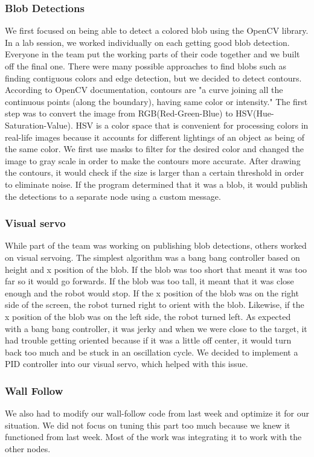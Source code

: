 \documentclass[journal, a4paper]{IEEEtran}
\begin{document}
\subsubsection{Blob Detections}We first focused on being able to detect a colored blob using the OpenCV library. In a lab session, we worked individually on each getting good blob detection. Everyone in the team put the working parts of their code together and we built off the final one. There were many possible approaches to find blobs such as finding contiguous colors and edge detection, but we decided to detect contours. According to OpenCV documentation, contours are "a curve joining all the continuous points (along the boundary), having same color or intensity." \cite{opencv-docs} The first step was to convert the image from RGB(Red-Green-Blue) to HSV(Hue-Saturation-Value). HSV is a color space that is convenient for processing colors in real-life images because it accounts for different lightings of an object as being of the same color. \cite{colorspace-handout} We first use masks to filter for the desired color and changed the image to gray scale in order to make the contours more accurate. After drawing the contours, it would check if the size is larger than a certain threshold in order to eliminate noise. If the program determined that it was a blob, it would publish the detections to a separate node using a custom message. 
\subsubsection{Visual servo}While part of the team was working on publishing blob detections, others worked on visual servoing. The simplest algorithm was a bang bang controller based on height and x position of the blob. If the blob was too short that meant it was too far so it would go forwards. If the blob was too tall, it meant that it was close enough and the robot would stop. If the x position of the blob was on the right side of the screen, the robot turned right to orient with the blob. Likewise, if the x position of the blob was on the left side, the robot turned left. As expected with a bang bang controller, it was jerky and when we were close to the target, it had trouble getting oriented because if it was a little off center, it would turn back too much and be stuck in an oscillation cycle. We decided to implement a PID controller into our visual servo, which helped with this issue. 
\subsubsection{Wall Follow}We also had to modify our wall-follow code from last week and optimize it for our situation. We did not focus on tuning this part too much because we knew it functioned from last week. Most of the work was integrating it to work with the other nodes.
\end{document}
